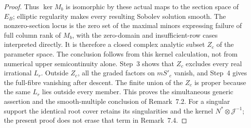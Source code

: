 \begin{proof}
Thus $\ker M_b$ is isomorphic by these actual maps to the section space of $E_B$; elliptic regularity makes every resulting Sobolev solution smooth. The nonzero-section locus is the zero set of the maximal minors expressing failure of full column rank of $M_b$, with the zero-domain and insufficient-row cases interpreted directly. It is therefore a closed complex analytic subset $Z_c$ of the parameter space. The conclusion follows from this kernel calculation, not from numerical upper semicontinuity alone. Step~3 shows that $Z_c$ excludes every real irrational $L_r$. Outside $Z_c$, all the graded factors on $mS'_c$ vanish, and Step~4 gives the full-fibre vanishing after descent. The finite union of the $Z_c$ is proper because the same $L_r$ lies outside every member. This proves the simultaneous generic assertion and the smooth-multiple conclusion of Remark~7.2. For a singular support the identical root cover retains its singularities and the kernel $N^*\otimes\mathcal J^{-1}$; the present proof does not erase that term in Remark~7.4.
\end{proof}
